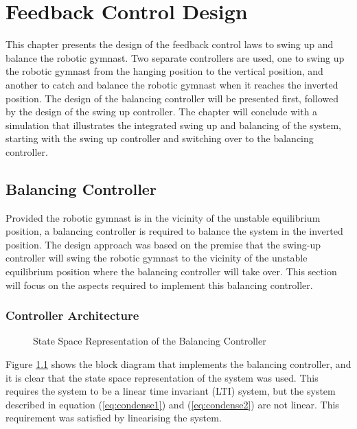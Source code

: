 \chapter{Feedback Control Design}
\label{chp:controller}
This chapter presents the design of the feedback control laws to swing up and balance the robotic gymnast. Two separate controllers are used, one to swing up the robotic gymnast from the hanging position to the vertical position, and another to catch and balance the robotic gymnast when it reaches the inverted position. The design of the balancing controller will be presented first, followed by the design of the swing up controller. The chapter will conclude with a simulation that illustrates the integrated swing up and balancing of the system, starting with the swing up controller and switching over to the balancing controller.

\section{Balancing Controller}

Provided the robotic gymnast is in the vicinity of the unstable equilibrium position, a balancing controller is required to balance the system in the inverted position. The design approach was based on the premise that the swing-up controller will swing the robotic gymnast to the vicinity of the unstable equilibrium position where the balancing controller will take over. This section will focus on the aspects required to implement this balancing controller.\\


\subsection{Controller Architecture}
\begin{figure}
	\centering
	
	\caption{State Space Representation of the Balancing Controller}
	\label{fig:linearSys2}
\end{figure}

Figure \ref{fig:linearSys2} shows the block diagram that implements the balancing controller, and it is clear that the state space representation of the system was used. This requires the system to be a linear time invariant (LTI) system, but the system described in equation (\ref{eq:condense1}) and (\ref{eq:condense2}) are not linear. This requirement was satisfied by linearising the system.\\

